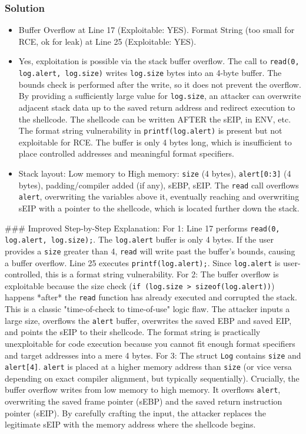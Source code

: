 \documentclass{article}
\begin{document}
\subsubsection*{Solution}
\begin{itemize}
    \item[\textbf{1.}] Buffer Overflow at Line 17 (Exploitable: YES). Format String (too small for RCE, ok for leak) at Line 25 (Exploitable: YES).
    \item[\textbf{2.}] Yes, exploitation is possible via the stack buffer overflow. The call to \texttt{read(0, log.alert, log.size)} writes \texttt{log.size} bytes into an 4-byte buffer. The bounds check is performed after the write, so it does not prevent the overflow. By providing a sufficiently large value for \texttt{log.size}, an attacker can overwrite adjacent stack data up to the saved return address and redirect execution to the shellcode. The shellcode can be written AFTER the sEIP, in ENV, etc. The format string vulnerability in \texttt{printf(log.alert)} is present but not exploitable for RCE. The buffer is only 4 bytes long, which is insufficient to place controlled addresses and meaningful format specifiers.
    \item[\textbf{3.}] Stack layout: Low memory to High memory: \texttt{size} (4 bytes), \texttt{alert[0:3]} (4 bytes), padding/compiler added (if any), sEBP, sEIP. The \texttt{read} call overflows \texttt{alert}, overwriting the variables above it, eventually reaching and overwriting sEIP with a pointer to the shellcode, which is located further down the stack.

\end{itemize}
\#\#\# Improved Step-by-Step Explanation:
For 1: Line 17 performs \texttt{read(0, log.alert, log.size);}. The \texttt{log.alert} buffer is only 4 bytes. If the user provides a \texttt{size} greater than 4, \texttt{read} will write past the buffer's bounds, causing a buffer overflow. Line 25 executes \texttt{printf(log.alert);}. Since \texttt{log.alert} is user-controlled, this is a format string vulnerability.
For 2: The buffer overflow is exploitable because the size check (\texttt{if (log.size > sizeof(log.alert))}) happens *after* the \texttt{read} function has already executed and corrupted the stack. This is a classic "time-of-check to time-of-use" logic flaw. The attacker inputs a large size, overflows the \texttt{alert} buffer, overwrites the saved EBP and saved EIP, and points the sEIP to their shellcode. The format string is practically unexploitable for code execution because you cannot fit enough format specifiers and target addresses into a mere 4 bytes.
For 3: The struct \texttt{Log} contains \texttt{size} and \texttt{alert[4]}. \texttt{alert} is placed at a higher memory address than \texttt{size} (or vice versa depending on exact compiler alignment, but typically sequentially). Crucially, the buffer overflow writes from low memory to high memory. It overflows \texttt{alert}, overwriting the saved frame pointer (sEBP) and the saved return instruction pointer (sEIP). By carefully crafting the input, the attacker replaces the legitimate sEIP with the memory address where the shellcode begins.
\end{document}
